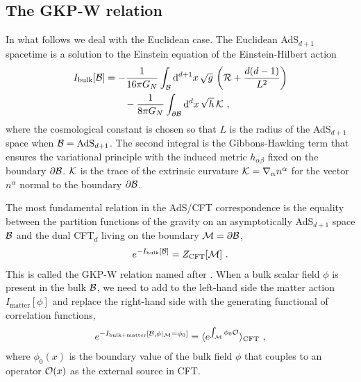\subsection{The GKP-W relation}
In what follows we deal with the Euclidean case.
The Euclidean AdS$_{d+1}$ spacetime is a solution to the Einstein equation of the Einstein-Hilbert action
\begin{align}\label{EH_action}
\begin{aligned}
I_\text{bulk} [{\cal B}] &= - \frac{1}{16\pi G_N} \int_{{\cal B}} \mathrm{d}^{d+1} x \, \sqrt{g}\, \left({\cal R} + \frac{d(d-1)}{L^2} \right) \\
	&\qquad - \frac{1}{8\pi G_N} \int_{\partial{\cal B}} \mathrm{d}^d x\, \sqrt{h}\, {\cal K}\ ,
\end{aligned}
\end{align}
where the cosmological constant is chosen so that $L$ is the radius of the AdS$_{d+1}$ space when ${\cal B} = \text{AdS}_{d+1}$.
The second integral is the Gibbons-Hawking term that ensures the variational principle with the induced metric $h_{\alpha\beta}$ fixed on the boundary $\partial {\cal B}$.
${\cal K}$ is the trace of the extrinsic curvature ${\cal K} = \nabla_\alpha n^\alpha$ for the vector $n^\alpha$ normal to the boundary $\partial{\cal B}$.

The most fundamental relation in the AdS/CFT correspondence is the equality between the partition functions of the gravity on an asymptotically AdS$_{d+1}$ space ${\cal B}$ and the dual CFT$_d$ living on the boundary ${\cal M} =\partial {\cal B}$,
\begin{align}\label{GKPW}
	 e^{- I_\text{bulk}[{\cal B}]} = Z_\text{CFT}[{\cal M}] \ .
\end{align}
This is called the GKP-W relation named after \textcite{Gubser:1998bc,Witten:1998qj}.
When a bulk scalar field $\phi$ is present in the bulk ${\cal B}$, we need to add to the left-hand side the matter action $I_\text{matter}[\phi]$ and replace the right-hand side with the generating functional of correlation functions,
\begin{align}
	e^{- I_\text{bulk+matter} [{\cal B}, \phi |_{{\cal M}} = \phi_0 ] } = \langle e^{\int_{{\cal M}} \phi_0 {\cal O} }\rangle_\text{CFT} \ ,
\end{align}
where $\phi_0 (x)$ is the boundary value of the bulk field $\phi$ that couples to an operator ${\cal O}(x)$ as the external source in CFT.

